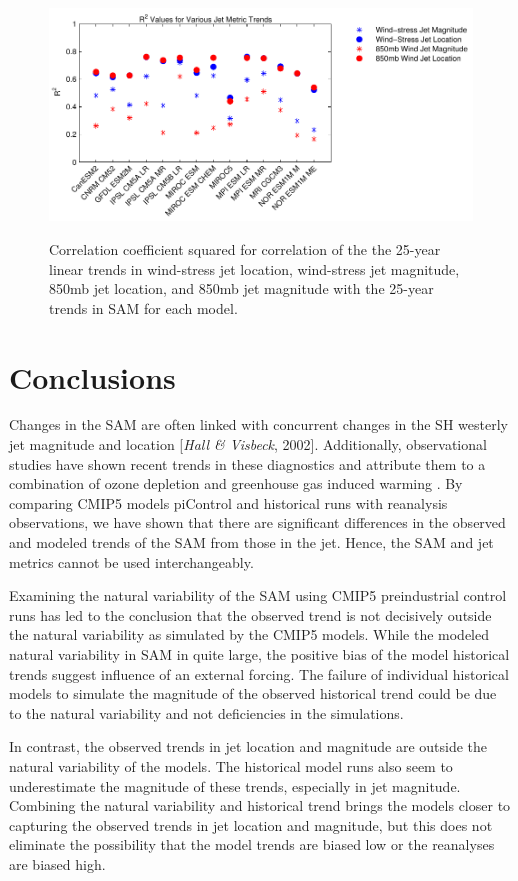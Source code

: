 \begin{figure}
\noindent
\includegraphics[width=0.9\linewidth]{figures/chapter-SHcirc/2014jgrl-p03.pdf}
\label{fig:ch2_fig3}
\caption{Correlation coefficient squared for correlation of the the 25-year
linear trends in wind-stress jet location, wind-stress jet magnitude, 850mb jet
location, and 850mb jet magnitude with the 25-year trends in SAM for each model.}
\end{figure}


\section{Conclusions}

Changes in the SAM are often linked with concurrent changes in the SH westerly
jet magnitude and location [\textit{Hall \& Visbeck}, 2002]. Additionally,
observational studies have shown recent trends in these diagnostics and
attribute them to a combination of ozone depletion and greenhouse gas induced
warming \citep{Arblaster2006}. By comparing CMIP5 models piControl and
historical runs with reanalysis observations, we have shown that there are
significant differences in the observed and modeled trends of the SAM from those
in the jet. Hence, the SAM and jet metrics cannot be used interchangeably.

Examining the natural variability of the SAM using CMIP5 preindustrial control
runs has led to the conclusion that the observed trend is not decisively outside
the natural variability as simulated by the CMIP5 models. While the modeled
natural variability in SAM in quite large, the positive bias of the model
historical trends suggest influence of an external forcing. The failure of
individual historical models to simulate the magnitude of the observed
historical trend could be due to the natural variability and not deficiencies in
the simulations.

In contrast, the observed trends in jet location and magnitude are outside the
natural variability of the models. The historical model runs also seem to
underestimate the magnitude of these trends, especially in jet magnitude.
Combining the natural variability and historical trend brings the models closer
to capturing the observed trends in jet location and magnitude, but this does
not eliminate the possibility that the model trends are biased low or the
reanalyses are biased high.

